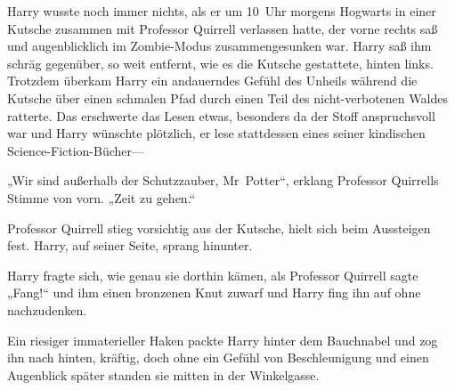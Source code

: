 Harry wusste noch immer nichts, als er um 10~Uhr morgens Hogwarts in einer Kutsche zusammen mit Professor Quirrell verlassen hatte, der vorne rechts saß und augenblicklich im Zombie-Modus zusammengesunken war. Harry saß ihm schräg gegenüber, so weit entfernt, wie es die Kutsche gestattete, hinten links. Trotzdem überkam Harry ein andauerndes Gefühl des Unheils während die Kutsche über einen schmalen Pfad durch einen Teil des nicht-verbotenen Waldes ratterte. Das erschwerte das Lesen etwas, besonders da der Stoff anspruchsvoll war und Harry wünschte plötzlich, er lese stattdessen eines seiner kindischen Science-Fiction-Bücher—

„Wir sind außerhalb der Schutzzauber, Mr~Potter“, erklang Professor Quirrells Stimme von vorn. „Zeit zu gehen.“

Professor Quirrell stieg vorsichtig aus der Kutsche, hielt sich beim Aussteigen fest. Harry, auf seiner Seite, sprang hinunter.

Harry fragte sich, wie genau sie dorthin kämen, als Professor Quirrell sagte „Fang!“ und ihm einen bronzenen Knut zuwarf und Harry fing ihn auf ohne nachzudenken.

Ein riesiger immaterieller Haken packte Harry hinter dem Bauchnabel und zog ihn nach hinten, kräftig, doch ohne ein Gefühl von Beschleunigung und einen Augenblick später standen sie mitten in der Winkelgasse.

